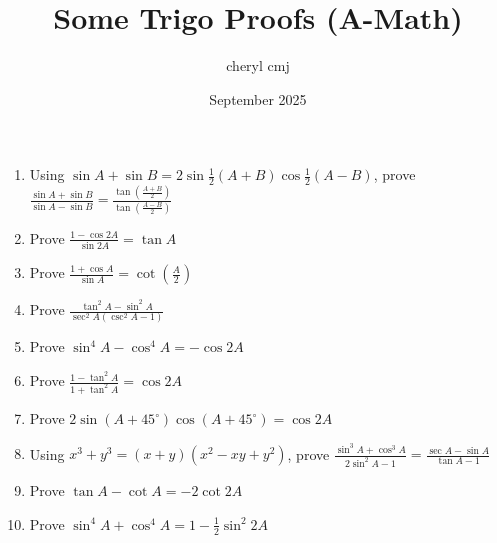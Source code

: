 \documentclass[14pt]{extarticle}
\title{Some Trigo Proofs (A-Math)}
\author{cheryl cmj}
\date{September 2025}
\begin{document}
\maketitle

\begin{flushleft}
\begin{enumerate}

\item Using $\sin A + \sin B = 2 \sin \frac{1}{2}(A + B)\cos \frac{1}{2} (A-B)$, prove $\frac{\sin A + \sin B}{\sin A - \sin B} = \frac{\tan \left( \frac{A + B}{2} \right)}{\tan \left( \frac{A - B}{2} \right)}$
\vspace{0.2in}


\item Prove $\frac{1 - \cos 2A}{\sin 2A} = \tan A$
\vspace{0.2in}


\item Prove $\frac{1 + \cos A}{\sin A} = \cot \left( \frac{A}{2} \right)$
\vspace{0.2in}
    
\item Prove $\frac{\tan^2 A - \sin^2 A}{\sec^2 A \left (\csc^2 A - 1\right)}$
\vspace{0.2in}

\item Prove $\sin^4 A - \cos^4 A = - \cos 2 A $   
\vspace{0.2in}
    

\item Prove $\frac{1 - \tan^2 A}{1 + \tan^2 A} = \cos 2 A $
\vspace{0.2in}

\item Prove $2 \sin \left(A + 45^\circ\right) \cos \left(A + 45^ \circ\right) = \cos 2A$
\vspace{0.2 in}


\item Using $ x^3 + y^3 = (x+y)(x^2 - xy+y^2)$, prove $\frac{\sin^3 A + \cos ^3 A}{2 \sin^2 A - 1} = \frac{\sec A - \sin A}{\tan A -1}$
\vspace{0.2 in}

\item Prove $\tan A - \cot A = -2 \cot 2A$
\vspace{0.2 in}

\item Prove $\sin^4 A + \cos^4 A = 1 - \frac{1}{2}\sin^2 2A$

\end{enumerate}

\maketitle

\end{flushleft}
\end{document}
